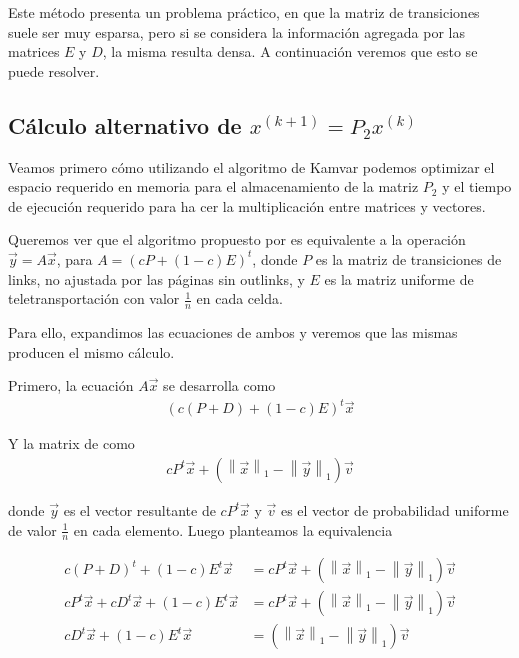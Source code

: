 Este método presenta un problema práctico, en que la matriz de transiciones suele ser muy
esparsa, pero si se considera la información agregada por las matrices $E$ y $D$, la misma
resulta densa. A continuación veremos que esto se puede resolver.

\subsection{Cálculo alternativo de $x^{(k + 1)} = P_2x^{(k)}$}

Veamos primero cómo utilizando el algoritmo de Kamvar podemos optimizar el espacio requerido
en memoria para el almacenamiento de la matriz $P_2$ y el tiempo de ejecución requerido para ha
cer la multiplicación entre matrices y vectores.

\newcommand{\vectornorm}[1]{\left\|#1\right\|}
Queremos ver que el algoritmo propuesto por \cite[Algoritmo 1]{Kamvar2003} es equivalente
a la operación $\vec{y} = A\vec{x}$, para $A=(cP + (1-c)E)^{t}$, donde $P$ es la matriz
de transiciones de links, no ajustada por las páginas sin outlinks,
y $E$ es la matriz uniforme de teletransportación con valor $\frac{1}{n}$ en cada celda.

Para ello, expandimos las ecuaciones de ambos y veremos que las mismas producen el mismo cálculo.

Primero, la ecuación $A\vec{x}$ se desarrolla como
\begin{align*}
(c(P + D) + (1 - c)E)^{t} \vec{x}
\end{align*}

Y la matrix de \cite[Algoritmo 1]{Kamvar 2003} como
\begin{align*}
cP^{t}\vec{x} + (\vectornorm{\vec{x}}_1 - \vectornorm{\vec{y}}_1)\vec{v}
\end{align*}

donde $\vec{y}$ es el vector resultante de $cP^{t}\vec{x}$ y $\vec{v}$ es el vector de probabilidad
uniforme de valor $\frac{1}{n}$ en cada elemento. Luego planteamos la equivalencia

\begin{align*}
c(P + D)^{t} + (1-c)E^{t} \vec{x} &= cP^{t}\vec{x} + (\vectornorm{\vec{x}}_1 - \vectornorm{\vec{y}}_1)\vec{v} \\
cP^{t}\vec{x} + cD^{t}\vec{x} + (1-c)E^{t}\vec{x} &= cP^{t}\vec{x} + (\vectornorm{\vec{x}}_1 - \vectornorm{\vec{y}}_1)\vec{v} \\
cD^{t}\vec{x} + (1-c)E^{t}\vec{x} &= (\vectornorm{\vec{x}}_1 - \vectornorm{\vec{y}}_1)\vec{v}
\end{align*}

